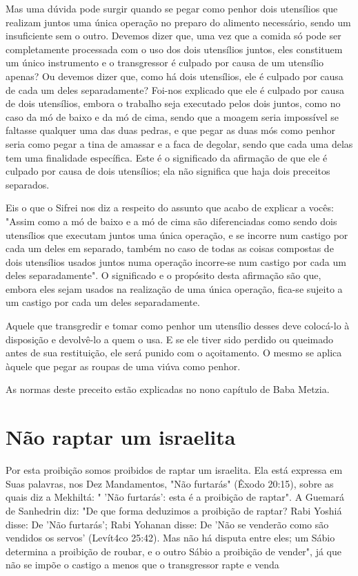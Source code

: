 \begin{itemize}
\begin{enumrate}
\begin{itemize}
\begin{itemize}
\begin{itemize}
Mas uma dúvida pode surgir quando se pegar como penhor dois uten­sílios
que realizam juntos uma única operação no preparo do alimento
necessá­rio, sendo um insuficiente sem o outro. Devemos dizer que, uma
vez que a co­mida só pode ser completamente processada com o uso dos
dois utensílios jun­tos, eles constituem um único instrumento e o
transgressor é culpado por cau­sa de um utensílio apenas? Ou devemos
dizer que, como há dois utensílios, ele é culpado por causa de cada um
deles separadamente? Foi-nos explicado que ele é culpado por causa de
dois utensílios, embora o trabalho seja executado pelos dois juntos,
como no caso da mó de baixo e da mó de cima, sendo que a moagem seria
impossível se faltasse qualquer uma das duas pedras, e que pe­gar as
duas mós como penhor seria como pegar a tina de amassar e a faca de
degolar, sendo que cada uma delas tem uma finalidade específica. Este é
o sig­nificado da afirmação de que ele é culpado por causa de dois
utensílios; ela não significa que haja dois preceitos separados.

Eis o que o Sifrei nos diz a respeito do assunto que acabo de expli­car
a vocês: "Assim como a mó de baixo e a mó de cima são diferenciadas como
sendo dois utensílios que executam juntos uma única operação, e se
incorre num castigo por cada um deles em separado, também no caso de
to­das as coisas compostas de dois utensílios usados juntos numa
operação incorre-se num castigo por cada um deles separadamente". O
significado e o pro­pósito desta afirmação são que, embora eles sejam
usados na realização de uma única operação, fica-se sujeito a um castigo
por cada um deles sepa­radamente.

Aquele que transgredir e tomar como penhor um utensílio desses deve
colocá-lo à disposição e devolvê-lo a quem o usa. E se ele tiver sido
per­dido ou queimado antes de sua restituição, ele será punido com o
açoita­mento. O mesmo se aplica àquele que pegar as roupas de uma viúva
como penhor.

As normas deste preceito estão explicadas no nono capítulo de Baba
Metzia.

\section{Não raptar um israelita}

Por esta proibição somos proibidos de raptar um israelita. Ela está
expressa em Suas palavras, nos Dez Mandamentos, "Não furtarás" (Êxodo
20:15), sobre as quais diz a Mekhiltá: " 'Não furtarás': esta é a
proibição de raptar". A Guemará de Sanhedrin diz: "De que forma
deduzimos a proibição de raptar? Rabi Yoshiá disse: De 'Não furtarás';
Rabi Yohanan disse: De 'Não se venderão como são vendidos os servos'
(Levít4co 25:42). Mas não há disputa entre eles; um Sábio determina a
proibição de roubar, e o outro Sábio a proibição de ven­der", já que não
se impõe o castigo a menos que o transgressor rapte e venda


\end{itemize}
\end{itemize}
\end{itemize}
\end{enumrate}
\end{itemize}
